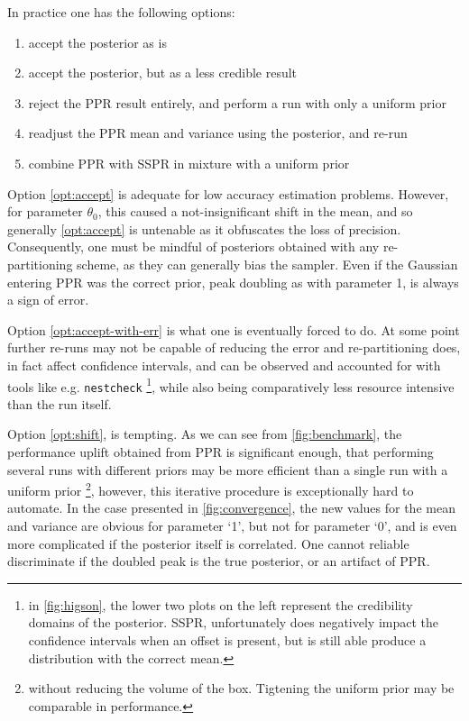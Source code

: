 \documentclass[usenatbib]{mnras}
\begin{document}
In practice one has the following options:
\begin{enumerate}
\item accept the posterior as is \label{opt:accept}
\item accept the posterior, but as a less credible result
\label{opt:accept-with-err}
\item reject the PPR result entirely, and perform a run with only a
uniform prior \label{opt:uniform}
\item readjust the PPR mean and variance using the posterior, and
re-run \label{opt:shift}
\item combine PPR with SSPR in mixture with a uniform prior
\end{enumerate}
Option \ref{opt:accept} is adequate for low accuracy estimation
problems. However, for parameter \(\theta_{0}\), this caused a
not-insignificant shift in the mean, and so generally \ref{opt:accept}
is untenable as it obfuscates the loss of precision. Consequently,
one must be mindful of posteriors obtained with any re-partitioning
scheme, as they can generally bias the sampler. Even if the Gaussian
entering PPR was the correct prior, peak doubling as with parameter
1, is always a sign of error.

Option \ref{opt:accept-with-err} is what one is eventually forced to
do. At some point further re-runs may not be capable of reducing the
error and re-partitioning does, in fact affect confidence intervals,
and can be observed and accounted for with tools like
e.g. \texttt{nestcheck} \footnote{in \autoref{fig:higson}, the lower two plots on
the left represent the credibility domains of the posterior. SSPR,
unfortunately does negatively impact the confidence intervals when
an offset is present, but is still able produce a distribution with
the correct mean.}, while also being comparatively less resource
intensive than the run itself.

Option \ref{opt:shift}, is tempting. As we can see from
\autoref{fig:benchmark}, the performance uplift obtained from PPR is
significant enough, that performing several runs with different
priors may be more efficient than a single run with a uniform prior
\footnote{without reducing the volume of the box. Tigtening the uniform
prior may be comparable in performance.}, however, this iterative
procedure is exceptionally hard to automate. In the case presented
in \autoref{fig:convergence}, the new values for the mean and variance
are obvious for parameter `1', but not for parameter `0', and is
even more complicated if the posterior itself is correlated. One
cannot reliable discriminate if the doubled peak is the true
posterior, or an artifact of PPR.
\end{document}
